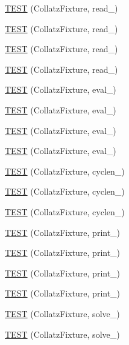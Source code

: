 \begin{DoxyCompactItemize}
\item 
\hyperlink{TestCollatz_8c_09_09_a66f4163404a0842f4f9eb6dcbfb35580}{T\-E\-S\-T} (Collatz\-Fixture, read\-\_)
\item 
\hyperlink{TestCollatz_8c_09_09_a3187ab2baa687bc11ef1402f3c5ac249}{T\-E\-S\-T} (Collatz\-Fixture, read\-\_)
\item 
\hyperlink{TestCollatz_8c_09_09_a910fd6352964fadd13f189dfb49f46f4}{T\-E\-S\-T} (Collatz\-Fixture, read\-\_)
\item 
\hyperlink{TestCollatz_8c_09_09_a0b5a76cb98b330891857af6177a4ee52}{T\-E\-S\-T} (Collatz\-Fixture, read\-\_)
\item 
\hyperlink{TestCollatz_8c_09_09_aa0fcdadaf0d4f7fe0919c37746fe7c74}{T\-E\-S\-T} (Collatz\-Fixture, eval\-\_)
\item 
\hyperlink{TestCollatz_8c_09_09_a333bb6921f06fa177e9818dbcf3eda06}{T\-E\-S\-T} (Collatz\-Fixture, eval\-\_)
\item 
\hyperlink{TestCollatz_8c_09_09_a251001c75c1226c607534268ab3a5bcb}{T\-E\-S\-T} (Collatz\-Fixture, eval\-\_)
\item 
\hyperlink{TestCollatz_8c_09_09_a033aa388470c35adc9579303dba1afa2}{T\-E\-S\-T} (Collatz\-Fixture, eval\-\_)
\item 
\hyperlink{TestCollatz_8c_09_09_af919ffdc8c0f8fa13c7dbd3f918b6c80}{T\-E\-S\-T} (Collatz\-Fixture, cyclen\-\_)
\item 
\hyperlink{TestCollatz_8c_09_09_a7b983656824f82b7d62a107e28e09979}{T\-E\-S\-T} (Collatz\-Fixture, cyclen\-\_)
\item 
\hyperlink{TestCollatz_8c_09_09_aa9d2145977f03d14f000b2c9700d361c}{T\-E\-S\-T} (Collatz\-Fixture, cyclen\-\_)
\item 
\hyperlink{TestCollatz_8c_09_09_a4bb3bce9465d20c35ec420e187f958c8}{T\-E\-S\-T} (Collatz\-Fixture, print\-\_)
\item 
\hyperlink{TestCollatz_8c_09_09_a710b14401102f6b4647268dd499a6c63}{T\-E\-S\-T} (Collatz\-Fixture, print\-\_)
\item 
\hyperlink{TestCollatz_8c_09_09_a3395d41febaedb3e4da972563e0cd383}{T\-E\-S\-T} (Collatz\-Fixture, print\-\_)
\item 
\hyperlink{TestCollatz_8c_09_09_ab955fb99f29049a09141ef516e672f4f}{T\-E\-S\-T} (Collatz\-Fixture, print\-\_)
\item 
\hyperlink{TestCollatz_8c_09_09_a3a16aafdd5586fe2f7442e7530e2ab6f}{T\-E\-S\-T} (Collatz\-Fixture, solve\-\_)
\item 
\hyperlink{TestCollatz_8c_09_09_a231d54f2c8c30622abc04e3e0fddb29f}{T\-E\-S\-T} (Collatz\-Fixture, solve\-\_)
\end{DoxyCompactItemize}


